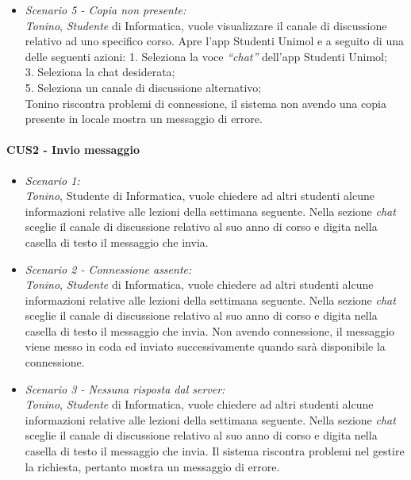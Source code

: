 \begin{itemize}
	\item \textit{Scenario 5 - Copia non presente:\\}
	\textit{Tonino}, \textit{Studente} di Informatica, vuole visualizzare il canale di discussione relativo ad uno specifico corso. Apre l’app Studenti Unimol e a seguito di una delle seguenti azioni:
	1. Seleziona la voce \textit{“chat”} dell’app Studenti Unimol;\\
	3. Seleziona la chat desiderata;\\
	5. Seleziona un canale di discussione alternativo;\\
	Tonino riscontra problemi di connessione, il sistema non avendo una copia presente in locale mostra un messaggio di errore.\\
\end{itemize}


\paragraph{CUS2 - Invio messaggio\\}
\begin{itemize}
	
	\item \textit{Scenario 1:\\}
	\textit{Tonino}, {Studente} di Informatica, vuole chiedere ad altri studenti alcune informazioni relative alle lezioni della settimana seguente. Nella sezione \textit{chat} sceglie il canale di discussione relativo al suo anno di corso e digita nella casella di testo il messaggio che invia.\\
	
	\item \textit{Scenario 2 - Connessione assente:\\}
	\textit{Tonino}, \textit{Studente} di Informatica, vuole chiedere ad altri studenti alcune informazioni relative alle lezioni della settimana seguente. Nella sezione \textit{chat} sceglie il canale di discussione relativo al suo anno di corso e digita nella casella di testo il messaggio che invia. Non avendo connessione, il messaggio viene messo in coda ed inviato successivamente quando sarà disponibile la connessione.\\
	
	\item \textit{Scenario 3 - Nessuna risposta dal server:\\}
	\textit{Tonino}, \textit{Studente} di Informatica, vuole chiedere ad altri studenti alcune informazioni relative alle lezioni della settimana seguente. Nella sezione \textit{chat} sceglie il canale di discussione relativo al suo anno di corso e digita nella casella di testo il messaggio che invia. Il sistema riscontra problemi nel gestire la richiesta, pertanto mostra un messaggio di errore.\\
\end{itemize}


